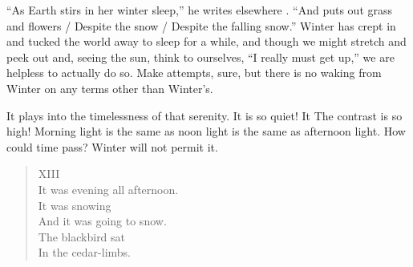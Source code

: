 \documentclass[12pt,oneside]{memoir}
\begin{document}
``As Earth stirs in her winter sleep,'' he writes elsewhere \parencite[173]{graves_poems}. ``And puts out grass and flowers / Despite the snow / Despite the falling snow.'' Winter has crept in and tucked the world away to sleep for a while, and though we might stretch and peek out and, seeing the sun, think to ourselves, ``I really must get up,'' we are helpless to actually do so. Make attempts, sure, but there is no waking from Winter on any terms other than Winter's.

It plays into the timelessness of that serenity. It is so quiet! It The contrast is so high! Morning light is the same as noon light is the same as afternoon light. How could time pass? Winter will not permit it.

\begin{verse}
XIII \\
It was evening all afternoon. \\
It was snowing \\
And it was going to snow. \\
The blackbird sat \\
In the cedar-limbs.

\parencite{blackbird}
\end{verse}
\end{document}
